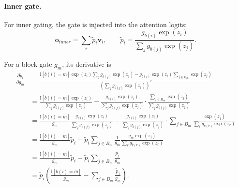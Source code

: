 \paragraph{Inner gate.}
For inner gating, the gate is injected into the attention logits:
\[
    \mathbf{o}_{inner}
    =
    \sum_i \tilde p_i \mathbf{v}_i,
    \qquad
    \tilde p_i
    =
    \frac{g_{b(i)}\exp(z_i)}
    {\sum_j g_{b(j)}\exp(z_j)} .
\]

For a block gate $g_m$, its derivative is
\[
\begin{aligned}
    \frac{\partial \tilde p_i}{\partial g_m}
    &=
    \frac{
    \mathbb{I}[b(i)=m]\exp(z_i)
    \sum_j g_{b(j)}\exp(z_j)
    -
    g_{b(i)}\exp(z_i)
    \sum_{j\in B_m}\exp(z_j)
    }
    {\left(\sum_j g_{b(j)}\exp(z_j)\right)^2}
    \\
    &=
    \frac{
    \mathbb{I}[b(i)=m]\exp(z_i)
    }
    {\sum_j g_{b(j)}\exp(z_j)}
    -
    \frac{
    g_{b(i)}\exp(z_i)
    }
    {\sum_j g_{b(j)}\exp(z_j)}
    \cdot
    \frac{
    \sum_{j\in B_m}\exp(z_j)
    }
    {\sum_j g_{b(j)}\exp(z_j)}
    \\
    &=
    \frac{\mathbb{I}[b(i)=m]}{g_m}
    \frac{
    g_{b(i)}\exp(z_i)
    }
    {\sum_j g_{b(j)}\exp(z_j)}
    -
    \frac{
    g_{b(i)}\exp(z_i)
    }
    {\sum_j g_{b(j)}\exp(z_j)}
    \cdot
    \sum_{j\in B_m}
    \frac{\exp(z_j)}
    {\sum_r g_{b(r)}\exp(z_r)}
    \\
    &=
    \frac{\mathbb{I}[b(i)=m]}{g_m}\tilde p_i
    -
    \tilde p_i
    \sum_{j\in B_m}
    \frac{1}{g_m}
    \frac{
    g_m\exp(z_j)
    }
    {\sum_r g_{b(r)}\exp(z_r)}
    \\
    &=
    \frac{\mathbb{I}[b(i)=m]}{g_m}\tilde p_i
    -
    \tilde p_i
    \sum_{j\in B_m}
    \frac{\tilde p_j}{g_m}
    \\
    &=
    \tilde p_i
    \left(
        \frac{\mathbb{I}[b(i)=m]}{g_m}
        -
        \sum_{j\in B_m}\frac{\tilde p_j}{g_m}
    \right).
\end{aligned}
\]

